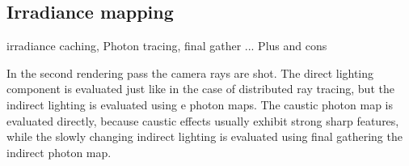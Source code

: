 \subsection{Irradiance mapping}
\cite{jarosz08thesis} %
irradiance caching, Photon tracing, final gather ...
Plus and cons



In the second rendering pass the camera rays are shot. The direct lighting component is evaluated just like in the case of distributed ray tracing, but the indirect lighting is evaluated using e photon maps. The caustic photon map is evaluated directly, because caustic effects usually exhibit strong sharp features, while the slowly changing indirect lighting is evaluated using final gathering the indirect photon map.


